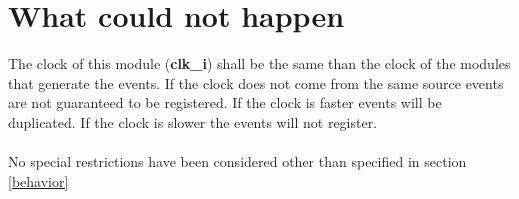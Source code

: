 \section{What could not happen}
The clock of this module (\textbf{clk\_i}) shall be the same than the clock of the modules that generate the events. If the clock does not come from the same source events are not guaranteed to be registered. If the clock is faster events will be duplicated. If the clock is slower the events will not register.\\
\\
No special restrictions have been considered other than specified  in section \ref{behavior}